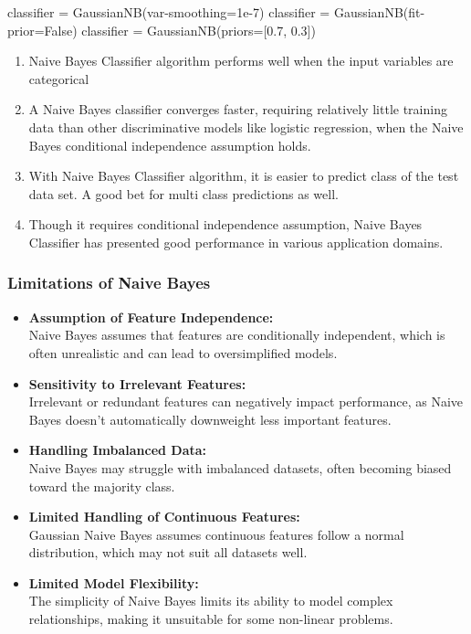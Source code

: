 \begin{python}
	classifier = GaussianNB(var-smoothing=1e-7)
	classifier = GaussianNB(fit-prior=False)
	classifier = GaussianNB(priors=[0.7, 0.3])
		\end{python}
		{
			\begin{enumerate}
				\item Naive Bayes Classifier algorithm performs well when the input variables are categorical
				\item A Naive Bayes classifier converges faster, requiring relatively little training data than other discriminative models like logistic regression, when the Naive Bayes conditional independence assumption holds.
				\item With Naive Bayes Classifier algorithm, it is easier to predict class of the test data set. A good bet for multi class predictions as well.
				\item 	Though it requires conditional independence assumption, Naive Bayes Classifier has presented good performance in various application domains.
			\end{enumerate}
		}	
	\begin{frame}
		\frametitle{Limitations of Naive Bayes}
		
		\begin{itemize}
			\item \textbf{Assumption of Feature Independence:} \\
			Naive Bayes assumes that features are conditionally independent, which is often unrealistic and can lead to oversimplified models.
			
			\item \textbf{Sensitivity to Irrelevant Features:} \\
			Irrelevant or redundant features can negatively impact performance, as Naive Bayes doesn't automatically downweight less important features.
			
			\item \textbf{Handling Imbalanced Data:} \\
			Naive Bayes may struggle with imbalanced datasets, often becoming biased toward the majority class.
			
			\item \textbf{Limited Handling of Continuous Features:} \\
			Gaussian Naive Bayes assumes continuous features follow a normal distribution, which may not suit all datasets well.
			
			\item \textbf{Limited Model Flexibility:} \\
			The simplicity of Naive Bayes limits its ability to model complex relationships, making it unsuitable for some non-linear problems.
		\end{itemize}
	\end{frame}
	

